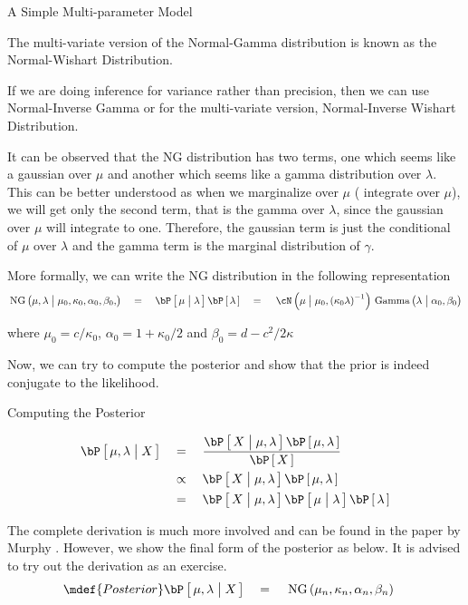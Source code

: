 \documentclass{article}
\begin{document}
\begin{ssection}[2]{A Simple Multi-parameter Model}
	\begin{remark}
		The multi-variate version of the Normal-Gamma distribution is known as the Normal-Wishart Distribution.
	\end{remark}

	\begin{remark}
		If we are doing inference for variance rather than precision, then we can use Normal-Inverse Gamma or for the multi-variate version, Normal-Inverse Wishart Distribution.
	\end{remark}

	It can be observed that the NG distribution has two terms, one which seems like a gaussian over $\mu$ and another which seems like a gamma distribution over $\lambda$. This can be better understood as when we marginalize over $\mu$ ( integrate over $\mu$), we will get only the second term, that is the gamma over $\lambda$, since the gaussian over $\mu$ will integrate to one. Therefore, the gaussian term is just the conditional of $\mu$ over $\lambda$ and the gamma term is the marginal distribution of $\gamma$. \br

	More formally, we can write the NG distribution in the following representation
	\begin{equation}
		\tfunc{NG}{\mu, \lambda \pipe \mu_0, \kappa_0, \alpha_0, \beta_0, }	\eq	\prob{\mu \pipe \lambda} \prob{\lambda}	\eq	\ND{\mu \pipe \mu_0, \para{\kappa_0 \lambda}^{-1}} \tfunc{Gamma}{\lambda \pipe \alpha_0, \beta_0}
	\end{equation}

	where $\mu_0 = c / \kappa_0$, $\alpha_0 = 1 + \kappa_0 / 2$ and $\beta_0 = d - c^2 / 2\kappa$ \br

	Now, we can try to compute the posterior and show that the prior is indeed conjugate to the likelihood.

	\begin{ssubsection}{Computing the Posterior}

		\begin{align*}
			\prob{\mu, \lambda \pipe X}	&\eq	\frac{\prob{X \pipe \mu, \lambda} \prob{\mu, \lambda}}{\prob{X}} \\
										&\qprop	\prob{X \pipe \mu, \lambda} \prob{\mu, \lambda} \\
										&\eq	\prob{X \pipe \mu, \lambda}	\prob{\mu \pipe \lambda} \prob{\lambda}
		\end{align*}

		The complete derivation is much more involved and can be found in the paper by Murphy \cite{murphy-bayes}. However, we show the final form of the posterior as below. It is advised to try out the derivation as an exercise.
		\begin{align}
			\mdef{Posterior}	\prob{\mu, \lambda \pipe X}	&\eq	\tfunc{NG}{\mu_n, \kappa_n, \alpha_n, \beta_n} &
		\end{align}


\end{ssubsection}
\end{ssection}
\end{document}
